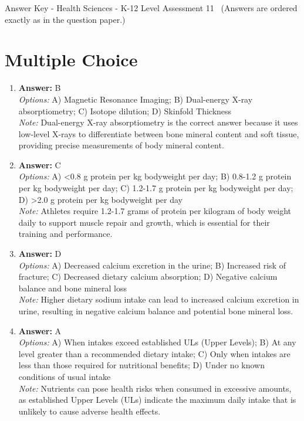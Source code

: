 \documentclass[12pt]{article}
\begin{document}
\begin{center}
Answer Key - Health Sciences - K-12 Level Assessment 11 \
\small (Answers are ordered exactly as in the question paper.)
\end{center}

\section*{Multiple Choice}
\begin{enumerate}[label=\arabic*.]
\item \textbf{Answer:} B
\\ \textit{Options:} A) Magnetic Resonance Imaging; B) Dual-energy X-ray absorptiometry; C) Isotope dilution; D) Skinfold Thickness
\\ \textit{Note:} Dual-energy X-ray absorptiometry is the correct answer because it uses low-level X-rays to differentiate between bone mineral content and soft tissue, providing precise measurements of body mineral content.
\item \textbf{Answer:} C
\\ \textit{Options:} A) \textless{}0.8 g protein per kg bodyweight per day; B) 0.8-1.2 g protein per kg bodyweight per day; C) 1.2-1.7 g protein per kg bodyweight per day; D) \textgreater{}2.0 g protein per kg bodyweight per day
\\ \textit{Note:} Athletes require 1.2-1.7 grams of protein per kilogram of body weight daily to support muscle repair and growth, which is essential for their training and performance.
\item \textbf{Answer:} D
\\ \textit{Options:} A) Decreased calcium excretion in the urine; B) Increased risk of fracture; C) Decreased dietary calcium absorption; D) Negative calcium balance and bone mineral loss
\\ \textit{Note:} Higher dietary sodium intake can lead to increased calcium excretion in urine, resulting in negative calcium balance and potential bone mineral loss.
\item \textbf{Answer:} A
\\ \textit{Options:} A) When intakes exceed established ULs (Upper Levels); B) At any level greater than a recommended dietary intake; C) Only when intakes are less than those required for nutritional benefits; D) Under no known conditions of usual intake
\\ \textit{Note:} Nutrients can pose health risks when consumed in excessive amounts, as established Upper Levels (ULs) indicate the maximum daily intake that is unlikely to cause adverse health effects.

\end{enumerate}
\end{document}
